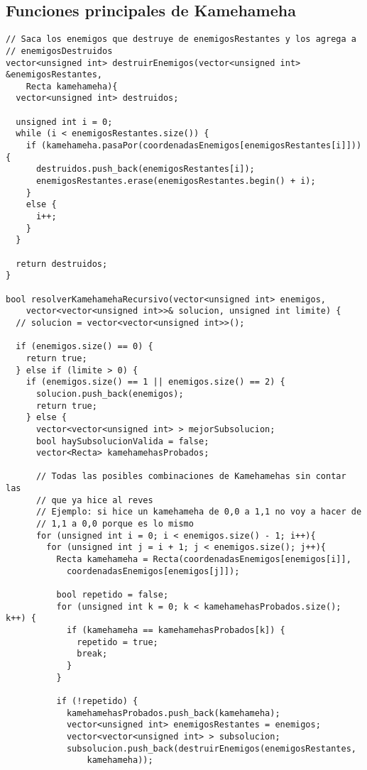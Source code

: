 \subsection{Funciones principales de Kamehameha}
\begin{lstlisting}
// Saca los enemigos que destruye de enemigosRestantes y los agrega a
// enemigosDestruidos
vector<unsigned int> destruirEnemigos(vector<unsigned int> &enemigosRestantes, 
	Recta kamehameha){
  vector<unsigned int> destruidos;

  unsigned int i = 0;
  while (i < enemigosRestantes.size()) {
    if (kamehameha.pasaPor(coordenadasEnemigos[enemigosRestantes[i]])){
      destruidos.push_back(enemigosRestantes[i]);
      enemigosRestantes.erase(enemigosRestantes.begin() + i);
    }
    else {
      i++;
    }
  }

  return destruidos;
}

bool resolverKamehamehaRecursivo(vector<unsigned int> enemigos, 
	vector<vector<unsigned int>>& solucion, unsigned int limite) {
  // solucion = vector<vector<unsigned int>>();

  if (enemigos.size() == 0) {
    return true;
  } else if (limite > 0) {
    if (enemigos.size() == 1 || enemigos.size() == 2) {
      solucion.push_back(enemigos);
      return true;
    } else {
      vector<vector<unsigned int> > mejorSubsolucion;
      bool haySubsolucionValida = false;
      vector<Recta> kamehamehasProbados;

      // Todas las posibles combinaciones de Kamehamehas sin contar las 
      // que ya hice al reves
      // Ejemplo: si hice un kamehameha de 0,0 a 1,1 no voy a hacer de 
      // 1,1 a 0,0 porque es lo mismo
      for (unsigned int i = 0; i < enemigos.size() - 1; i++){
        for (unsigned int j = i + 1; j < enemigos.size(); j++){
          Recta kamehameha = Recta(coordenadasEnemigos[enemigos[i]], 
          	coordenadasEnemigos[enemigos[j]]);

          bool repetido = false;
          for (unsigned int k = 0; k < kamehamehasProbados.size(); k++) {
            if (kamehameha == kamehamehasProbados[k]) {
              repetido = true;
              break;
            }
          }

          if (!repetido) {
            kamehamehasProbados.push_back(kamehameha);
            vector<unsigned int> enemigosRestantes = enemigos;
            vector<vector<unsigned int> > subsolucion;
            subsolucion.push_back(destruirEnemigos(enemigosRestantes, 
            	kamehameha));


\end{lstlisting}
